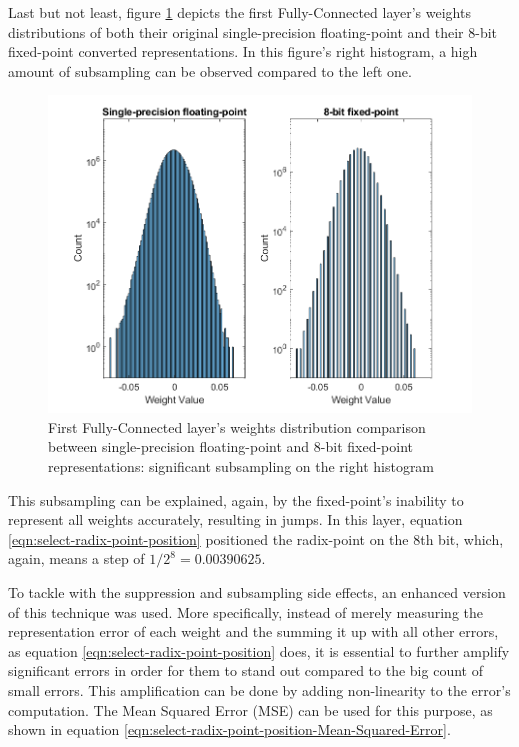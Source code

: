 Last but not least, figure \ref{fig:weight-distribution-comparison-FC1} depicts the first Fully-Connected layer's weights distributions of both their original single-precision floating-point and their 8-bit fixed-point converted representations. In this figure's right histogram, a high amount of subsampling can be observed compared to the left one.

\begin{figure} [H]
	\centering
	\includegraphics[scale=0.9]{Images/Weights-distributions/original-vs-fixed8/weight-distribution-FC1.png}
	\decoRule
	\caption[First Fully-Connected layer's weights distribution comparison between single-precision floating-point and 8-bit fixed-point representations]{First Fully-Connected layer's weights distribution comparison between single-precision floating-point and 8-bit fixed-point representations: significant subsampling on the right histogram}
	\label{fig:weight-distribution-comparison-FC1}
\end{figure}

This subsampling can be explained, again, by the fixed-point's inability to represent all weights accurately, resulting in jumps. In this layer, equation \ref{eqn:select-radix-point-position} positioned the radix-point on the 8th bit, which, again, means a step of $1/2^8 = 0.00390625$.

To tackle with the suppression and subsampling side effects, an enhanced version of this technique was used. More specifically, instead of merely measuring the representation error of each weight and the summing it up with all other errors, as equation \ref{eqn:select-radix-point-position} does, it is essential to further amplify significant errors in order for them to stand out compared to the big count of small errors. This amplification can be done by adding non-linearity to the error's computation. The Mean Squared Error (MSE) can be used for this purpose, as shown in equation \ref{eqn:select-radix-point-position-Mean-Squared-Error}.

